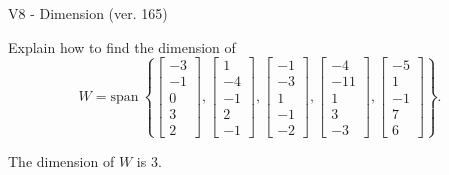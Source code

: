 \begin{exercise}
  \begin{exerciseTitle}V8 - Dimension (ver. 165)\end{exerciseTitle}
  \begin{exerciseStatement}
    Explain how to find the dimension of 
\[W=\mathrm{span}\ \left\{\left[\begin{array}{r}
-3 \\
-1 \\
0 \\
3 \\
2
\end{array}\right] , \left[\begin{array}{r}
1 \\
-4 \\
-1 \\
2 \\
-1
\end{array}\right] , \left[\begin{array}{r}
-1 \\
-3 \\
1 \\
-1 \\
-2
\end{array}\right] , \left[\begin{array}{r}
-4 \\
-11 \\
1 \\
3 \\
-3
\end{array}\right] , \left[\begin{array}{r}
-5 \\
1 \\
-1 \\
7 \\
6
\end{array}\right]\right\}.\]



  \end{exerciseStatement}
  \begin{exerciseAnswer}
   The dimension of \(W\) is  \(3\).
  


  \end{exerciseAnswer}
\end{exercise}